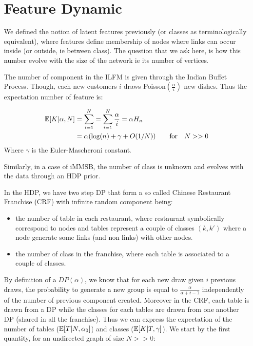 \section{Feature Dynamic}

We defined the notion of latent features previously (or classes as terminologically equivalent), where features define membership of nodes where links can occur inside (or outside, ie between class).  The question that we ask here, is how this number evolve with the size of the network ie its number of vertices.


The number of component in the ILFM is given through the Indian Buffet Process. Though, each new customers $i$ draws Poisson$(\frac{\alpha}{i})$ new dishes. Thus the expectation number of feature is:

\begin{align*}
\mathbb{E}[K|\alpha, N] &= \sum_{i=1}^{N} = \sum_{i=1}^N \frac{\alpha}{i} = \alpha H_n \\
&= \alpha(\log(n) + \gamma +O(1/N) ) \qquad  \textnormal{for} \quad N >> 0
\end{align*}
Where $\gamma$ is the Euler-Mascheroni constant.

Similarly, in a case of iMMSB, the number of class is unknown and evolves with the data through an HDP prior.

In the HDP, we have two step DP that form a so called Chinese
Restaurant Franchise (CRF) with infinite random component being:
\begin{itemize}
\item the number of
table in each restaurant, where restaurant symbolically correspond to
nodes and tables represent a couple of classes $(k,k')$ where a node generate some links (and non links) with other nodes. 
\item the
number of class in the franchise, where each table is associated to a couple of classes.
\end{itemize}

By definition of a \(DP(\alpha)\), we know that for each new draw given
\(i\) previous draws, the probability to generate a new group is equal
to \(\frac{\alpha}{\alpha +i-1}\) independently of the number of previous
component created. Moreover in the CRF, each table is drawn from a DP while the classes for each tables are drawn from one another DP (shared in all the franchise). Thus we can express the expectation of the number of tables ($\mathbb{E}[T|N, \alpha_0]$) and classes ($\mathbb{E}[K|T, \gamma]$). We start by the first quantity, for an undirected graph of size $N >> 0$:

